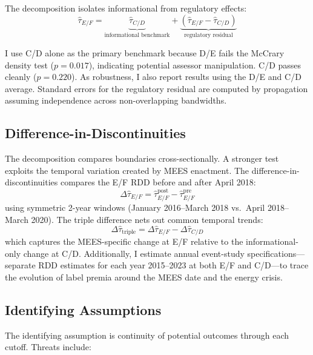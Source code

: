 \documentclass[12pt]{article}
\begin{document}
The decomposition isolates informational from regulatory effects:
\begin{equation}
\hat{\tau}_{E/F} = \underbrace{\hat{\tau}_{C/D}}_{\text{informational benchmark}} + \underbrace{(\hat{\tau}_{E/F} - \hat{\tau}_{C/D})}_{\text{regulatory residual}}
\end{equation}

I use C/D alone as the primary benchmark because D/E fails the McCrary density test ($p = 0.017$), indicating potential assessor manipulation. C/D passes cleanly ($p = 0.220$). As robustness, I also report results using the D/E and C/D average. Standard errors for the regulatory residual are computed by propagation assuming independence across non-overlapping bandwidths.

\subsection{Difference-in-Discontinuities}\label{sec:diff_disc}

The decomposition compares boundaries cross-sectionally. A stronger test exploits the temporal variation created by MEES enactment. The difference-in-discontinuities compares the E/F RDD before and after April 2018:
\begin{equation}
\Delta\hat{\tau}_{E/F} = \hat{\tau}_{E/F}^{\text{post}} - \hat{\tau}_{E/F}^{\text{pre}}
\end{equation}
using symmetric 2-year windows (January 2016--March 2018 vs.\ April 2018--March 2020). The triple difference nets out common temporal trends:
\begin{equation}
\Delta\hat{\tau}_{\text{triple}} = \Delta\hat{\tau}_{E/F} - \Delta\hat{\tau}_{C/D}
\end{equation}
which captures the MEES-specific change at E/F relative to the informational-only change at C/D. Additionally, I estimate annual event-study specifications---separate RDD estimates for each year 2015--2023 at both E/F and C/D---to trace the evolution of label premia around the MEES date and the energy crisis.

\subsection{Identifying Assumptions}

The identifying assumption is continuity of potential outcomes through each cutoff. Threats include:
\end{document}
